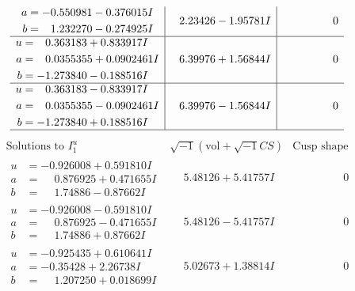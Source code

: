 \documentclass[1p]{elsarticle_modified}
\theoremstyle{definition}
\newcommand{\I}{\sqrt{-1}}
\begin{document}
$$\begin{array}{c|c|c}
\begin{aligned}
a &= -0.550981 - 0.376015 I \\
b &= \phantom{-}1.232270 - 0.274925 I\end{aligned}
 & \phantom{-}2.23426 - 1.95781 I & \phantom{-0.000000 } 0 \\ \hline\begin{aligned}
u &= \phantom{-}0.363183 + 0.833917 I \\
a &= \phantom{-}0.0355355 + 0.0902461 I \\
b &= -1.273840 - 0.188516 I\end{aligned}
 & \phantom{-}6.39976 + 1.56844 I & \phantom{-0.000000 } 0 \\ \hline\begin{aligned}
u &= \phantom{-}0.363183 - 0.833917 I \\
a &= \phantom{-}0.0355355 - 0.0902461 I \\
b &= -1.273840 + 0.188516 I\end{aligned}
 & \phantom{-}6.39976 - 1.56844 I & \phantom{-0.000000 } 0\\
 \hline 
 \end{array}$$\newpage$$\begin{array}{c|c|c}  
\text{Solutions to }I^u_{1}& \I (\text{vol} + \sqrt{-1}CS) & \text{Cusp shape}\\
 \hline 
\begin{aligned}
u &= -0.926008 + 0.591810 I \\
a &= \phantom{-}0.876925 + 0.471655 I \\
b &= \phantom{-}1.74886 - 0.87662 I\end{aligned}
 & \phantom{-}5.48126 + 5.41757 I & \phantom{-0.000000 } 0 \\ \hline\begin{aligned}
u &= -0.926008 - 0.591810 I \\
a &= \phantom{-}0.876925 - 0.471655 I \\
b &= \phantom{-}1.74886 + 0.87662 I\end{aligned}
 & \phantom{-}5.48126 - 5.41757 I & \phantom{-0.000000 } 0 \\ \hline\begin{aligned}
u &= -0.925435 + 0.610641 I \\
a &= -0.35428 + 2.26738 I \\
b &= \phantom{-}1.207250 + 0.018699 I\end{aligned}
 & \phantom{-}5.02673 + 1.38814 I & \phantom{-0.000000 } 0 \\ \hline\begin{aligned}

\end{aligned}
\end{array}$$
\end{document}
